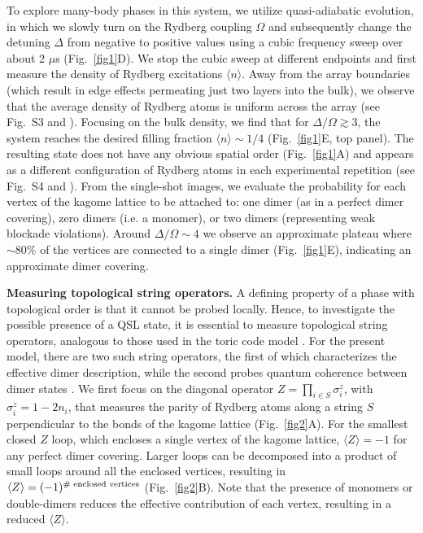 \documentclass[twocolumn,amssymb,secnumarabic, prl, aps, nofootinbib]{revtex4-1}
\begin{document}
To explore  many-body phases in this system, we utilize quasi-adiabatic evolution, in which we slowly  
turn on the Rydberg coupling $\Omega$ 
and subsequently change the detuning $\Delta$ from negative to positive values 
using a cubic frequency sweep over about 2 $\mu$s (Fig.~\ref{fig1}D).
We stop the cubic sweep at different endpoints and first 
measure the density of Rydberg excitations $\langle  n \rangle$. 
Away from the array boundaries (which result in edge effects permeating just two layers into the bulk), we observe that the average density of Rydberg atoms is uniform across the array (see Fig.~S3 and \cite{Supplement}). 
Focusing on the bulk density, we find that for $\Delta/\Omega \gtrsim 3$, the system reaches the desired filling fraction $\langle n \rangle \sim 1/4$ (Fig.~\ref{fig1}E, top panel). The resulting state does not have any obvious spatial order (Fig.~\ref{fig1}A) and appears as a different
configuration of Rydberg atoms in each experimental repetition (see Fig.~S4 and \cite{Supplement}). 
From the single-shot images, we evaluate the probability for each vertex of the kagome lattice to be attached to: one dimer (as in a perfect dimer covering), zero dimers (i.e. a monomer), or two dimers (representing weak blockade violations). Around $\Delta/\Omega\sim 4$ we observe an approximate plateau where $\sim 80\%$ of the vertices are connected to a single dimer (Fig.~\ref{fig1}E), indicating an approximate dimer covering.

\noindent \textbf{Measuring topological string operators.}
A defining property of a phase with topological order is that it cannot be probed locally. Hence, to investigate the possible presence of a QSL state, it is essential to measure topological string operators, analogous to those used in the toric code model \cite{Kitaev2003fault}. For the present model, there are two such string operators, the first of which characterizes the effective dimer description, while the second probes quantum coherence between dimer states \cite{Ruben2020}.
We first focus on the diagonal operator $Z=\prod_{i \in S}
\sigma_i^z$, with $\sigma_i^z = 1- 2n_i$,
that measures the parity of Rydberg atoms along a string $S$ perpendicular to the bonds of the kagome lattice (Fig.~\ref{fig2}A).
For the smallest closed $Z$ loop, which encloses a single vertex of the kagome lattice, $\langle Z \rangle = -1$ for any perfect dimer covering.
Larger loops can be decomposed into a product of small loops around all the enclosed vertices, resulting in  
$\langle Z \rangle = (-1)^{\textnormal{\# enclosed vertices}}$ (Fig.~\ref{fig2}B).
Note that the presence of 
monomers or double-dimers reduces the effective contribution of each vertex, resulting in a reduced $\langle Z \rangle$. 
\end{document}
